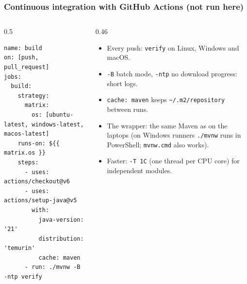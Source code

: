 \documentclass[aspectratio=169,10pt,compress]{beamer}
\begin{document}




\begin{frame}[t,fragile] \frametitle{Continuous integration with GitHub Actions (not run here)}
  \begin{columns}[T]
    \begin{column}{0.5\textwidth}


\begin{lstlisting}[style=codesnippet, language={}, basicstyle=\ttfamily\tiny]
name: build
on: [push, pull_request]
jobs:
  build:
    strategy:
      matrix:
        os: [ubuntu-latest, windows-latest, macos-latest]
    runs-on: ${{ matrix.os }}
    steps:
      - uses: actions/checkout@v6
      - uses: actions/setup-java@v5
        with:
          java-version: '21'
          distribution: 'temurin'
          cache: maven
      - run: ./mvnw -B -ntp verify
\end{lstlisting}


    \end{column}
    \begin{column}{0.46\textwidth}
      \begin{itemize}\small
        \item Every push: \texttt{verify} on Linux, Windows and macOS.
        \item \texttt{-B} batch mode, \texttt{-ntp} no download progress: short logs.
        \item \texttt{cache: maven} keeps \texttt{\textasciitilde/.m2/repository} between runs.
        \item The wrapper: the same Maven as on the laptops (on Windows runners \texttt{./mvnw} runs in PowerShell; \texttt{mvnw.cmd} also works).
        \item Faster: \texttt{-T 1C} (one thread per CPU core) for independent modules.
      \end{itemize}
    \end{column}
  \end{columns}
\end{frame}

\end{document}
